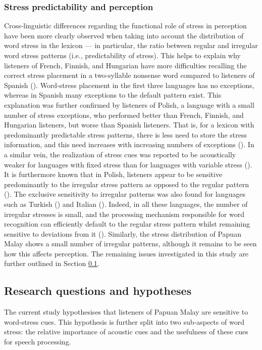 \subsubsection{Stress predictability and perception}
Cross-linguistic differences regarding the functional role of stress in perception have been more clearly observed when taking into account the distribution of word stress in the lexicon — in particular, the ratio between regular and irregular word stress patterns (i.e., predictability of stress). This helps to explain why listeners of French, Finnish, and Hungarian have more difficulties recalling the correct stress placement in a two-syllable nonsense word compared to listeners of Spanish (\citealt{peperkamp_perception_2010}). Word-stress placement in the first three languages has no exceptions, whereas in Spanish many exceptions to the default pattern exist. This explanation was further confirmed by listeners of Polish, a language with a small number of stress exceptions, who performed better than French, Finnish, and Hungarian listeners, but worse than Spanish listeners. That is, for a lexicon with predominantly predictable stress patterns, there is less need to store the stress information, and this need increases with increasing numbers of exceptions (\citealt{peperkamp_perception_2010}). In a similar vein, the realization of stress cues was reported to be acoustically weaker for languages with fixed stress than for languages with variable stress (\citealt{dogil_phonetic_1999}). It is furthermore known that in Polish, listeners appear to be sensitive predominantly to the irregular stress pattern as opposed to the regular pattern (\citealt{domahs_stress_2012}). The exclusive sensitivity to irregular patterns was also found for languages such as Turkish (\citealt{domahs_processing_2013}) and Italian (\citealt{sulpizio_italians_2012}). Indeed, in all these languages, the number of irregular stresses is small, and the processing mechanism responsible for word recognition can efficiently default to the regular stress pattern whilst remaining sensitive to deviations from it (\citealt{sulpizio_italians_2012}). Similarly, the stress distribution of Papuan Malay shows a small number of irregular patterns, although it remains to be seen how this affects perception. The remaining issues investigated in this study are further outlined in Section \ref{sec313}.

\subsection{Research questions and hypotheses} \label{sec313}
The current study hypothesises that listeners of Papuan Malay are sensitive to word-stress cues. This hypothesis is further split into two sub-aspects of word stress: the relative importance of acoustic cues and the usefulness of these cues for speech processing.


